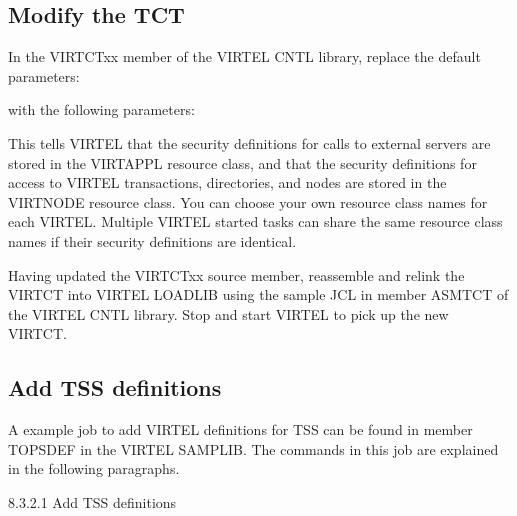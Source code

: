 \documentclass[letterpaper,10pt,english]{sphinxmanual}
\begin{document}
\subsection{Modify the TCT}
\label{\detokenize{Installation_Guide:modify-the-tct}}
In the VIRTCTxx member of the VIRTEL CNTL library, replace the default parameters:

\begin{sphinxVerbatim}[commandchars=\\\{\}]
\end{sphinxVerbatim}

with the following parameters:

\begin{sphinxVerbatim}[commandchars=\\\{\}]
\end{sphinxVerbatim}

This tells VIRTEL that the security definitions for calls to external servers are stored in the VIRTAPPL resource class, and that the security definitions for access to VIRTEL transactions, directories, and nodes are stored in the VIRTNODE resource class. You can choose your own resource class names for each VIRTEL.  Multiple VIRTEL started tasks can share the same resource class names if their security definitions are identical.

Having updated the VIRTCTxx source member, reassemble and relink the VIRTCT into VIRTEL LOADLIB using the sample JCL in member ASMTCT of the VIRTEL CNTL library. Stop and start VIRTEL to pick up the new VIRTCT.


\subsection{Add TSS definitions}
\label{\detokenize{Installation_Guide:add-tss-definitions}}\label{\detokenize{Installation_Guide:index-184}}
A example job to add VIRTEL definitions for TSS can be found in member TOPSDEF in the VIRTEL SAMPLIB. The commands in this job are explained in the following paragraphs.

8.3.2.1 Add TSS definitions
\end{document}

